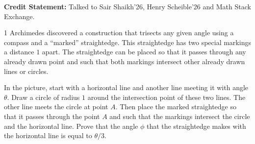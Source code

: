 \documentclass[12pt]{article}
\begin{document}

\textbf{Credit Statement:} Talked to Sair Shaikh'26, Henry Scheible'26 and Math Stack Exchange.

\begin{problem}{1}
    Archimedes discovered a construction that trisects any given angle using a compass and a “marked” straightedge. This straightedge has two special markings a distance $1$ apart.
    The straightedge can be placed so that it passes through any already drawn point and such that both markings intersect other already drawn lines or circles.
    \begin{center}
    \end{center}

    In the picture, start with a horizontal line and another line meeting it with angle $\theta$. Draw a circle of radius $1$ around the intersection point of these two lines. The other line meets the circle at point $A$. Then place the marked straightedge so that it passes through the point $A$ and such that the markings intersect the circle and the horizontal line. Prove that the angle $\phi$ that the straightedge makes with the horizontal line is equal to $\theta/3$.
\end{problem}
\end{document}

